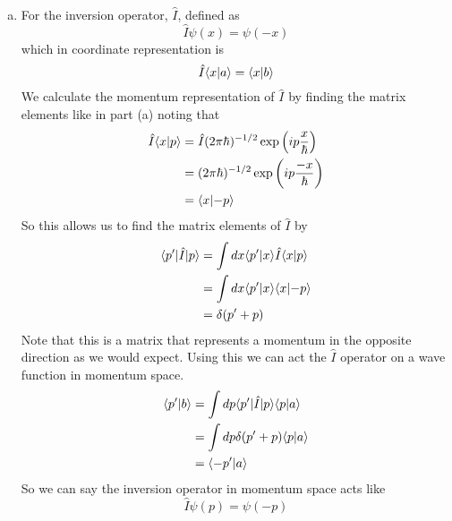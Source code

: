 \documentclass[11pt]{article}
\numberwithin{equation}{section}
\begin{document}
\begin{enumerate}[(a)]
\item For the inversion operator, $\hat{I}$, defined as
$$\hat{I}\psi(x) = \psi(-x)$$
which in coordinate representation is
$$\hat{I}\langle{x}|{a}\rangle = \langle{x}|{b}\rangle$$
We calculate the momentum representation of $\hat{I}$ by finding the matrix elements like in
part (a) noting that
\begin{align*}
\hat{I}\langle{x}|{p}\rangle &= \hat{I}(2\pi\hbar)^{-1/2}\exp\left(ip\frac{x}{\hbar}\right)\\
&= (2\pi\hbar)^{-1/2}\exp\left(ip\frac{-x}{\hbar}\right)\\
&= \langle{x}|{-p}\rangle
\end{align*}
So this allows us to find the matrix elements of $\hat{I}$ by
\begin{align*}
\langle{p'}|\hat{I}|{p}\rangle &= \int{dx}\langle{p'}|{x}\rangle\hat{I}\langle{x}|{p}\rangle\\
&= \int{dx}\langle{p'}|{x}\rangle\langle{x}|{-p}\rangle\\
&= \delta(p'+p)
\end{align*}
Note that this is a matrix that represents a momentum in the opposite direction as we would 
expect. Using this we can act the $\hat{I}$ operator on a wave function in momentum space.
\begin{align*}
\langle{p'}|{b}\rangle &= \int{dp}\langle{p'}|\hat{I}|{p}\rangle\langle{p}|{a}\rangle\\
&= \int{dp}\delta(p'+p)\langle{p}|{a}\rangle\\
&= \langle{-p'}|{a}\rangle\\
\end{align*}
So we can say the inversion operator in momentum space acts like
$$\hat{I}\psi(p) = \psi(-p)$$
\end{enumerate}

\pagebreak
\end{document}

